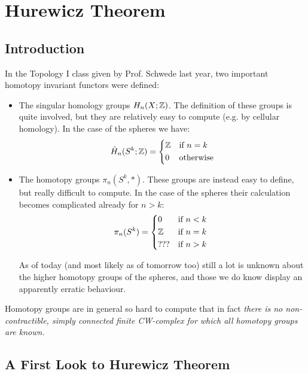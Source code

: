 
\renewcommand{\thechapter}{\Roman{chapter}}

\chapter{Hurewicz Theorem}
\label{chapter:hurewicz}

\section{Introduction}


In the Topology I class given by Prof. Schwede last year, two important homotopy invariant functors were defined:

\begin{itemize}
    \item The singular homology groups $H_n(X;{\mathbb Z})$. The definition of these groups is quite involved, but they are relatively easy to compute (e.g. by cellular homology). In the case of the spheres we have:
    \[\til{H}_n(S^k;\Z)=\begin{cases*}\Z & if $n=k$ \\ 0 & otherwise\end{cases*}\]
    
    \item The homotopy groups $\pi_n(S^k,*)$. These groups are instead easy to define, but really difficult to compute. In the case of the spheres their calculation becomes complicated already for $n>k$:
    \[\pi_n(S^k)=\begin{cases*}0 & if $n<k$ \\ \Z & if $n=k$ \\ ??? & if $n>k$\end{cases*}\]
    
    As of today (and most likely as of tomorrow too) still a lot is unknown about the higher homotopy groups of the spheres, and those we do know display an apparently erratic behaviour.
\end{itemize}

Homotopy groups are in general so hard to compute that in fact \emph{there is no non-contractible, simply connected finite CW-complex for which all homotopy groups are known.}

\section{A First Look to Hurewicz Theorem}

